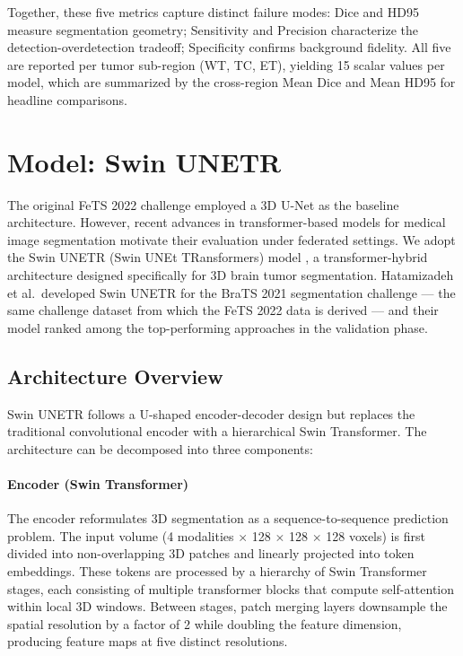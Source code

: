 \documentclass{article}
\begin{document}
\medskip
Together, these five metrics capture distinct failure modes: Dice and HD95 measure segmentation geometry; Sensitivity and Precision characterize the detection-overdetection tradeoff; Specificity confirms background fidelity. All five are reported per tumor sub-region (WT, TC, ET), yielding 15 scalar values per model, which are summarized by the cross-region Mean Dice and Mean HD95 for headline comparisons.

\section{Model: Swin UNETR}

The original FeTS 2022 challenge employed a 3D U-Net as the baseline architecture. However, recent advances in transformer-based models for medical image segmentation motivate their evaluation under federated settings. We adopt the Swin UNETR (Swin UNEt TRansformers) model \cite{hatamizadeh_swin_2022}, a transformer-hybrid architecture designed specifically for 3D brain tumor segmentation. Hatamizadeh et al.\ developed Swin UNETR for the BraTS 2021 segmentation challenge --- the same challenge dataset from which the FeTS 2022 data is derived --- and their model ranked among the top-performing approaches in the validation phase.

\subsection{Architecture Overview}

Swin UNETR follows a U-shaped encoder-decoder design but replaces the traditional convolutional encoder with a hierarchical Swin Transformer. The architecture can be decomposed into three components:

\paragraph{Encoder (Swin Transformer)} The encoder reformulates 3D segmentation as a sequence-to-sequence prediction problem. The input volume (4 modalities $\times$ 128 $\times$ 128 $\times$ 128 voxels) is first divided into non-overlapping 3D patches and linearly projected into token embeddings. These tokens are processed by a hierarchy of Swin Transformer stages, each consisting of multiple transformer blocks that compute self-attention within local 3D windows. Between stages, patch merging layers downsample the spatial resolution by a factor of 2 while doubling the feature dimension, producing feature maps at five distinct resolutions.
\end{document}
